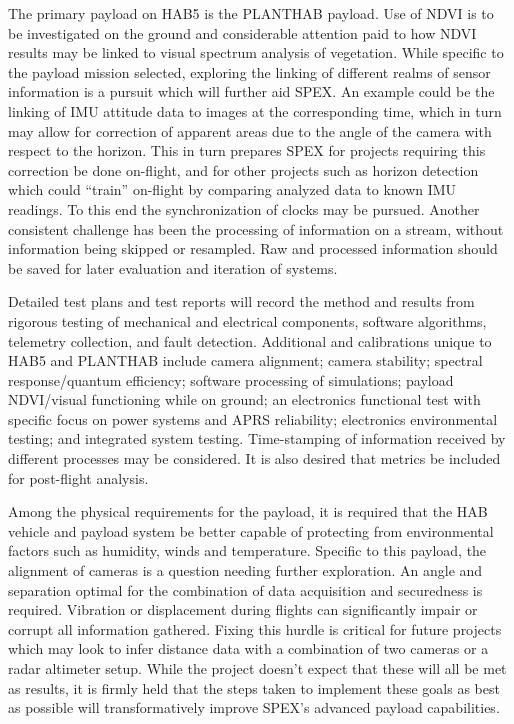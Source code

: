 \documentclass[conference]{IEEEtran} %
\begin{document}
The primary payload on HAB5 is the PLANTHAB payload.
Use of NDVI is to be investigated on the ground and considerable attention paid to how NDVI results may be linked to visual spectrum analysis of vegetation.
While specific to the payload mission selected, exploring the linking of different realms of sensor information is a pursuit which will further aid SPEX.
An example could be the linking of IMU attitude data to images at the corresponding time, which in turn may allow for correction of apparent areas due to the angle of the camera with respect to the horizon.
This in turn prepares SPEX for projects requiring this correction be done on-flight, and for other projects such as horizon detection which could ``train'' on-flight by comparing analyzed data to known IMU readings.
To this end the synchronization of clocks may be pursued.
Another consistent challenge has been the processing of information on a stream, without information being skipped or resampled.
Raw and processed information should be saved for later evaluation and iteration of systems.

Detailed test plans and test reports will record the method and results from rigorous testing of mechanical and electrical components, software algorithms, telemetry collection, and fault detection.
Additional and calibrations unique to HAB5 and PLANTHAB include camera alignment; camera stability; spectral response/quantum efficiency; software processing of simulations; payload NDVI/visual functioning while on ground; an electronics functional test with specific focus on power systems and APRS reliability; electronics environmental testing; and integrated system testing.
Time-stamping of information received by different processes may be considered.
It is also desired that metrics be included for post-flight analysis.

Among the physical requirements for the payload, it is required that the HAB vehicle and payload system be better capable of protecting from environmental factors such as humidity, winds and temperature. Specific to this payload, the alignment of cameras is a question needing further exploration. An angle and separation optimal for the combination of data acquisition and securedness is required. Vibration or displacement during flights can significantly impair or corrupt all information gathered. Fixing this hurdle is critical for future projects which may look to infer distance data with a combination of two cameras or a radar altimeter setup. While the project doesn't expect that these will all be met as results, it is firmly held that the steps taken to implement these goals as best as possible will transformatively improve SPEX's advanced payload capabilities.
\end{document}
